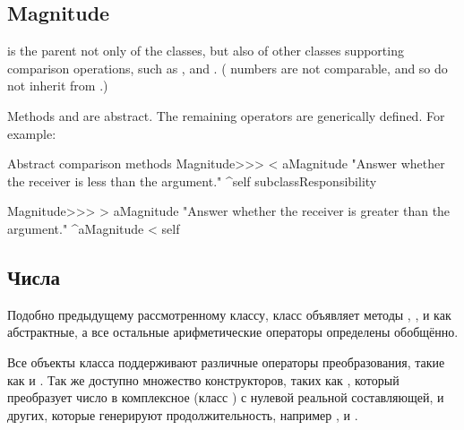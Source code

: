 \documentclass[a4paper,10pt,twoside]{book}
\begin{document}
\subsection{Magnitude}

 is the parent not only of the  classes, but also of other classes supporting comparison operations, such as ,  and .  ( numbers are not comparable, and so do not inherit from .)

Methods  and  are abstract. The remaining operators are generically defined. For example:

\begin{method}{Abstract comparison methods}
Magnitude>>> < aMagnitude 
    "Answer whether the receiver is less than the argument."
    ^self subclassResponsibility

Magnitude>>> > aMagnitude 
    "Answer whether the receiver is greater than the argument."
    ^aMagnitude < self
\end{method}

\subsection{Числа}

Подобно предыдущему рассмотренному классу, класс  объявляет методы , ,  и  как абстрактные, а все остальные арифметические операторы определены обобщённо.

Все объекты класса  поддерживают различные операторы преобразования, такие как  и . Так же доступно множество конструкторов, таких как , который преобразует число в комплексное (класс ) с нулевой реальной составляющей, и других, которые генерируют продолжительность, например ,  и .
\end{document}
